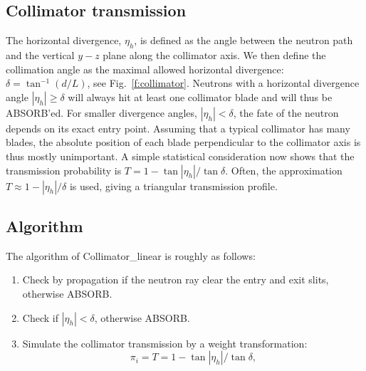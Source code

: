 \subsection{Collimator transmission}
The horizontal divergence, $\eta_h$, is defined as the angle between the
neutron path and the vertical $y-z$ plane along the collimator axis.
We then define the collimation angle as the maximal allowed
horizontal divergence: $\delta = \tan^{-1}(d/L)$,
see Fig.~\ref{f:collimator}. Neutrons with a horizontal
divergence angle $|\eta_h| \geq \delta$ will always
hit at least one collimator blade and will thus be ABSORB'ed.
For smaller divergence angles, $|\eta_h| < \delta$, the fate of the
neutron depends on its exact entry point.
Assuming that a typical collimator has many blades, the
absolute position of each blade perpendicular to the collimator axis
is thus mostly unimportant.
A simple statistical consideration now shows that the transmission
probability is $T = 1-\tan|\eta_h|/\tan\delta$.
Often, the approximation $T \approx 1-|\eta_h|/\delta$ is used, giving
a triangular transmission profile.

\subsection{Algorithm}
The algorithm of \textrm{Collimator\_linear} is roughly as follows:
\begin{enumerate}
\item Check by propagation if the neutron ray clear the entry and exit slits,
otherwise ABSORB.
\item Check if $|\eta_h| < \delta$, otherwise ABSORB.
\item Simulate the collimator transmission by a weight transformation:
\begin{equation}
\pi_i = T = 1-\tan|\eta_h|/ \tan\delta ,
\end{equation}
\end{enumerate}
